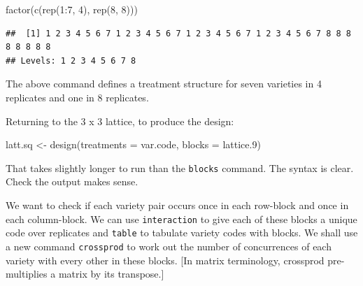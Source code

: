 \documentclass[
]{book}
\newenvironment{Shaded}{\begin{snugshade}}{\end{snugshade}}
\newcommand{\AttributeTok}[1]{\textcolor[rgb]{0.77,0.63,0.00}{#1}}
\newcommand{\DecValTok}[1]{\textcolor[rgb]{0.00,0.00,0.81}{#1}}
\newcommand{\FloatTok}[1]{\textcolor[rgb]{0.00,0.00,0.81}{#1}}
\newcommand{\FunctionTok}[1]{\textcolor[rgb]{0.00,0.00,0.00}{#1}}
\newcommand{\NormalTok}[1]{#1}
\newcommand{\OtherTok}[1]{\textcolor[rgb]{0.56,0.35,0.01}{#1}}
\newcommand{\SpecialCharTok}[1]{\textcolor[rgb]{0.00,0.00,0.00}{#1}}
\begin{document}
\begin{Shaded}
\begin{Highlighting}[]
\FunctionTok{factor}\NormalTok{(}\FunctionTok{c}\NormalTok{(}\FunctionTok{rep}\NormalTok{(}\DecValTok{1}\SpecialCharTok{:}\DecValTok{7}\NormalTok{, }\DecValTok{4}\NormalTok{), }\FunctionTok{rep}\NormalTok{(}\DecValTok{8}\NormalTok{, }\DecValTok{8}\NormalTok{)))}
\end{Highlighting}
\end{Shaded}

\begin{verbatim}
##  [1] 1 2 3 4 5 6 7 1 2 3 4 5 6 7 1 2 3 4 5 6 7 1 2 3 4 5 6 7 8 8 8 8 8 8 8 8
## Levels: 1 2 3 4 5 6 7 8
\end{verbatim}

The above command defines a treatment structure for seven varieties in 4 replicates and one in 8 replicates.

Returning to the 3 x 3 lattice, to produce the design:

\begin{Shaded}
\begin{Highlighting}[]
\NormalTok{latt.sq }\OtherTok{\textless{}{-}} \FunctionTok{design}\NormalTok{(}\AttributeTok{treatments =}\NormalTok{ var.code, }\AttributeTok{blocks =}\NormalTok{ lattice}\FloatTok{.9}\NormalTok{)}
\end{Highlighting}
\end{Shaded}

That takes slightly longer to run than the \texttt{blocks} command. The syntax is clear. Check the output makes sense.

We want to check if each variety pair occurs once in each row-block and once in each column-block. We can use \texttt{interaction} to give each of these blocks a unique code over replicates and \texttt{table} to tabulate variety codes with blocks. We shall use a new command \texttt{crossprod} to work out the number of concurrences of each variety with every other in these blocks. {[}In matrix terminology, crossprod pre-multiplies a matrix by its transpose.{]}

\begin{Shaded}
\end{Shaded}
\end{document}
